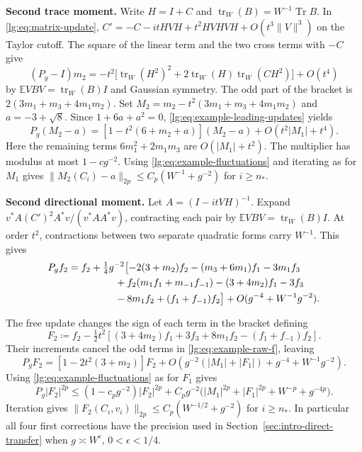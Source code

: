 \documentclass[11pt]{article}
\numberwithin{equation}{section}
\theoremstyle{remark}
\newcommand{\E}{\mathbb E}
\newcommand{\Tr}{\operatorname{Tr}}
\begin{document}
\noindent\textbf{Second trace moment.}
Write $H=I+C$ and $\operatorname{tr}_W(B)=W^{-1}\Tr B$.
In \eqref{lg:eq:matrix-update}, $C'=-C-itHVH+t^2HVHVH+O(t^3\|V\|^3)$
on the Taylor cutoff. The square of the linear term and the two cross
terms with $-C$ give
\[
 (P_g-I)m_2=-t^2\bigl[\operatorname{tr}_W(H^2)^2+
                  2\operatorname{tr}_W(H)\operatorname{tr}_W(CH^2)\bigr]+O(t^4)
\]
by $\E VBV=\operatorname{tr}_W(B)I$ and Gaussian symmetry. The odd part
of the bracket is $2(3m_1+m_3+4m_1m_2)$. Set
$M_2=m_2-t^2(3m_1+m_3+4m_1m_2)$ and $a=-3+\sqrt8$. Since
$1+6a+a^2=0$, \eqref{lg:eq:example-leading-updates} yields
\[
 P_g(M_2-a)=[1-t^2(6+m_2+a)](M_2-a)+O(t^2|M_1|+t^4).
\]
Here the remaining terms $6m_1^2+2m_1m_3$ are $O(|M_1|+t^2)$.
The multiplier has modulus at most $1-cg^{-2}$. Using
\eqref{lg:eq:example-fluctuations} and iterating as for $M_1$ gives
$\|M_2(C_i)-a\|_{2p}\le C_p(W^{-1}+g^{-2})$ for $i\ge n_*$.

\noindent\textbf{Second directional moment.}
Let $A=(I-itVH)^{-1}$. Expand $v^*A(C')^2A^*v/(v^*AA^*v)$,
contracting each pair by $\E VBV=\operatorname{tr}_W(B)I$.
At order $t^2$, contractions between two separate quadratic forms
carry $W^{-1}$. This gives
\begin{equation}\label{lg:eq:example-raw-f}
 \begin{aligned}
 P_gf_2={}&f_2+\tfrac14g^{-2}\bigl[
 -2(3+m_2)f_2-(m_3+6m_1)f_1-3m_1f_3\\
 &\hspace{12mm}+f_2(m_1f_1+m_{-1}f_{-1})
 -(3+4m_2)f_1-3f_3\\
 &\hspace{12mm}-8m_1f_2+(f_1+f_{-1})f_2\bigr]
 +O(g^{-4}+W^{-1}g^{-2}).
 \end{aligned}
\end{equation}

The free update changes the sign of each term in the bracket defining
\begin{equation}\label{lg:eq:example-corrections}
 F_2\coloneqq f_2-\tfrac12 t^2
       [(3+4m_2)f_1+3f_3+8m_1f_2-(f_1+f_{-1})f_2].
\end{equation}
Their increments cancel the odd terms in \eqref{lg:eq:example-raw-f}, leaving
\begin{equation}\label{lg:eq:example-updates}
 P_gF_2=[1-2t^2(3+m_2)]F_2
       +O(g^{-2}(|M_1|+|F_1|)+g^{-4}+W^{-1}g^{-2}).
\end{equation}
Using \eqref{lg:eq:example-fluctuations} as for $F_1$ gives
\begin{equation}\label{lg:eq:first-F2-moment}
 P_g|F_2|^{2p}\le(1-c_pg^{-2})|F_2|^{2p}
  +C_pg^{-2}\bigl(|M_1|^{2p}+|F_1|^{2p}+W^{-p}+g^{-4p}\bigr).
\end{equation}
Iteration gives
$\|F_2(C_i,v_i)\|_{2p}\le C_p(W^{-1/2}+g^{-2})$ for $i\ge n_*$.
In particular all four first corrections have the precision used in
Section~\ref{sec:intro-direct-transfer} when $g\asymp W^\epsilon$,
$0<\epsilon<1/4$.
\end{document}
